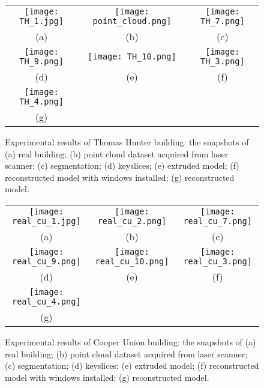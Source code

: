 \begin{figure} [htbp]
\begin{center}
\begin{tabular}{ccc}
\texttt{[image: TH\_1.jpg]} &
\texttt{[image: point\_cloud.png]} &
\texttt{[image: TH\_7.png]} \\
(a) & (b) & (c)\\
\texttt{[image: TH\_9.png]} &
\texttt{[image: TH\_10.png]} &
\texttt{[image: TH\_3.png]} \\
(d) & (e) & (f)\\
\texttt{[image: TH\_4.png]} \\
(g)
\end{tabular}
\end{center}
\caption{ Experimental results of Thomas Hunter building: the snapshots of
      (a) real building;
      (b) point cloud dataset acquired from laser scanner;
      (c) segmentation;
      (d) keyslices;
      (e) extruded model;
      (f) reconstructed model with windows installed;
      (g) reconstructed model.
}
\label{fig:TH_Fig}
\end{figure}

\begin{figure} [htbp]
\begin{center}
\begin{tabular}{ccc}
\texttt{[image: real\_cu\_1.jpg]} &
\texttt{[image: real\_cu\_2.png]} &
\texttt{[image: real\_cu\_7.png]} \\
(a) & (b) & (c)\\
\texttt{[image: real\_cu\_9.png]} &
\texttt{[image: real\_cu\_10.png]} &
\texttt{[image: real\_cu\_3.png]} \\
(d) & (e) & (f)\\
\texttt{[image: real\_cu\_4.png]} \\
(g)
\end{tabular}
\end{center}
\caption{ Experimental results of Cooper Union building: the snapshots of
      (a) real building;
      (b) point cloud dataset acquired from laser scanner;
      (c) segmentation;
      (d) keyslices;
      (e) extruded model;
      (f) reconstructed model with windows installed;
      (g) reconstructed model.
}
\label{fig:real_cu_Fig}
\end{figure}


